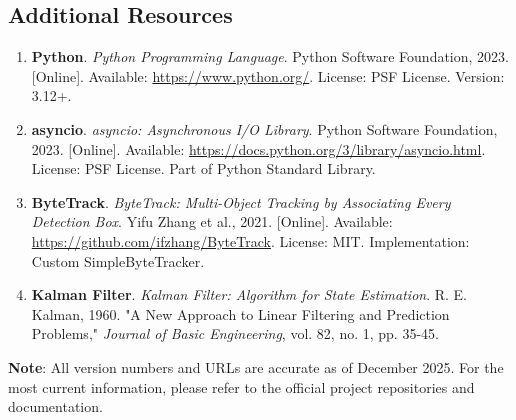 \subsection*{Additional Resources}

\begin{enumerate}[resume]
    \item \textbf{Python}. \textit{Python Programming Language}. 
    Python Software Foundation, 2023. [Online]. Available: \url{https://www.python.org/}. 
    License: PSF License. Version: 3.12+.
    
    \item \textbf{asyncio}. \textit{asyncio: Asynchronous I/O Library}. 
    Python Software Foundation, 2023. [Online]. Available: \url{https://docs.python.org/3/library/asyncio.html}. 
    License: PSF License. Part of Python Standard Library.
    
    \item \textbf{ByteTrack}. \textit{ByteTrack: Multi-Object Tracking by Associating Every Detection Box}. 
    Yifu Zhang et al., 2021. [Online]. Available: \url{https://github.com/ifzhang/ByteTrack}. 
    License: MIT. Implementation: Custom SimpleByteTracker.
    
    \item \textbf{Kalman Filter}. \textit{Kalman Filter: Algorithm for State Estimation}. 
    R. E. Kalman, 1960. "A New Approach to Linear Filtering and Prediction Problems," 
    \textit{Journal of Basic Engineering}, vol. 82, no. 1, pp. 35-45.
\end{enumerate}

\vspace{1cm}
\textbf{Note}: All version numbers and URLs are accurate as of December 2025. 
For the most current information, please refer to the official project repositories and documentation.

